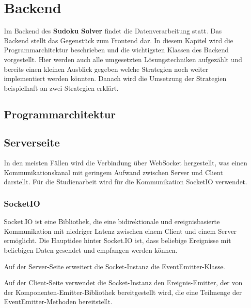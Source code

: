 
\chapter{Backend}

Im Backend des \textbf{Sudoku Solver} findet die Datenverarbeitung statt. Das Backend stellt das Gegenstück zum Frontend dar. In diesem Kapitel wird die Programmarchitektur beschrieben und die wichtigsten Klassen des Backend vorgestellt. Hier werden auch alle umgesetzten Lösungstechniken aufgezählt und bereits einen kleinen Ausblick gegeben welche Strategien noch weiter implementiert werden könnten. Danach wird die Umsetzung der Strategien beispielhaft an zwei Strategien erklärt.


\section{Programmarchitektur}


\section{Serverseite}


In den meisten Fällen wird die Verbindung über WebSocket hergestellt, was einen Kommunikationskanal mit geringem Aufwand zwischen Server und Client darstellt. Für die Studienarbeit wird für die Kommunikation SocketIO verwendet. 

\subsection{SocketIO}

Socket.IO ist eine Bibliothek, die eine bidirektionale und ereignisbasierte Kommunikation mit niedriger Latenz zwischen einem Client und einem Server ermöglicht. Die Hauptidee hinter Socket.IO ist, dass beliebige Ereignisse mit beliebigen Daten gesendet und empfangen werden können.

Auf der Server-Seite erweitert die Socket-Instanz die EventEmitter-Klasse.

Auf der Client-Seite verwendet die Socket-Instanz den Ereignis-Emitter, der von der Komponenten-Emitter-Bibliothek bereitgestellt wird, die eine Teilmenge der EventEmitter-Methoden bereitstellt.

